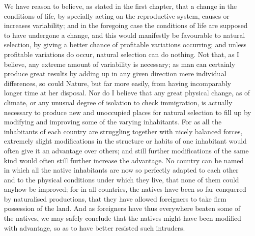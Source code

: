 We have reason to believe, as stated in the first chapter, that a change in the conditions of life, by specially acting on the reproductive system, causes or increases variability; and in the foregoing case the conditions of life are supposed to have undergone a change, and this would manifestly be favourable to natural selection, by giving a better chance of profitable variations occurring; and unless profitable variations do occur, natural selection can do nothing. Not that, as I believe, any extreme amount of variability is necessary; as man can certainly produce great results by adding up in any given direction mere individual differences, so could Nature, but far more easily, from having incomparably longer time at her disposal. Nor do I believe that any great physical change, as of climate, or any unusual degree of isolation to check immigration, is actually necessary to produce new and unoccupied places for natural selection to fill up by modifying and improving some of the varying inhabitants. For as all the inhabitants of each country are struggling together with nicely balanced forces, extremely slight modifications in the structure or habits of one inhabitant would often give it an advantage over others; and still further modifications of the same kind would often still further increase the advantage. No country can be named in which all the native inhabitants are now so perfectly adapted to each other and to the physical conditions under which they live, that none of them could anyhow be improved; for in all countries, the natives have been so far conquered by naturalised productions, that they have allowed foreigners to take firm possession of the land. And as foreigners have thus everywhere beaten some of the natives, we may safely conclude that the natives might have been modified with advantage, so as to have better resisted such intruders.

